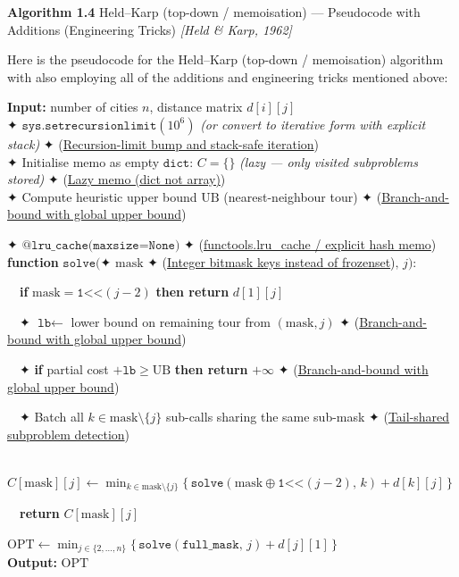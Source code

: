 \documentclass[11pt]{article}
\begin{document}
    \begin{pseudobox}

\textbf{Algorithm 1.4} Held--Karp (top-down / memoisation) ---
Pseudocode with Additions (Engineering Tricks) \emph{{[}Held \& Karp,
1962{]}}

\tcbline

Here is the pseudocode for the Held--Karp (top-down / memoisation)
algorithm with also employing all of the additions and engineering
tricks mentioned above:

\textbf{Input:} number of cities \(n\), distance matrix \(d[i][j]\)\\
✦ \(\texttt{sys.setrecursionlimit}(10^6)\) \emph{(or convert to
iterative form with explicit stack)} ✦
(\hyperref[trick-1-4-3]{Recursion-limit bump and stack-safe
iteration})\\
✦ Initialise memo as empty \(\texttt{dict}\): \(C = \{\}\) \emph{(lazy
--- only visited subproblems stored)} ✦ (\hyperref[trick-1-4-5]{Lazy
memo (dict not array)})\\
✦ Compute heuristic upper bound \(\mathrm{UB}\) (nearest-neighbour tour)
✦ (\hyperref[trick-1-4-4]{Branch-and-bound with global upper bound})

✦ \(\texttt{@lru\_cache(maxsize=None)}\) ✦
(\hyperref[trick-1-4-1]{functools.lru\_cache / explicit hash memo})\\
\textbf{function} \(\texttt{solve}(\)✦ \(\text{mask}\) ✦
(\hyperref[trick-1-4-2]{Integer bitmask keys instead of
frozenset})\(,\, j)\):\\
\strut ~~\textbf{if} \(\text{mask} = \texttt{1<<}(j{-}2)\) \textbf{then
return} \(d[1][j]\)\\
\strut ~~✦ \(\texttt{lb} \leftarrow\) lower bound on remaining tour from
\((\text{mask}, j)\) ✦ (\hyperref[trick-1-4-4]{Branch-and-bound with
global upper bound})\\
\strut ~~✦ \textbf{if} partial cost \(+ \texttt{lb} \geq \mathrm{UB}\)
\textbf{then return} \(+\infty\) ✦
(\hyperref[trick-1-4-4]{Branch-and-bound with global upper bound})\\
\strut ~~✦ Batch all \(k\in\text{mask}\setminus\{j\}\) sub-calls sharing
the same sub-mask ✦ (\hyperref[trick-1-4-6]{Tail-shared subproblem
detection})\\
\strut ~~\(C[\text{mask}][j] \leftarrow \min_{k \in \text{mask}\setminus\{j\}} \bigl\{\, \texttt{solve}(\text{mask}\oplus\texttt{1<<}(j{-}2),\, k) + d[k][j] \,\bigr\}\)\\
\strut ~~\textbf{return} \(C[\text{mask}][j]\)

\(\text{OPT} \leftarrow \min_{j\in\{2,\ldots,n\}} \bigl\{\, \texttt{solve}(\texttt{full\_mask},\, j) + d[j][1] \,\bigr\}\)\\
\textbf{Output:} \(\text{OPT}\)

\end{pseudobox}
\end{document}
